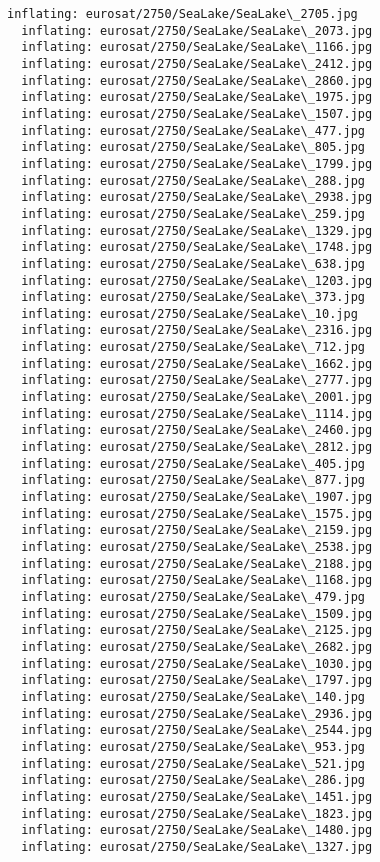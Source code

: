 \documentclass[11pt]{article}
\begin{document}
\begin{Verbatim}[commandchars=\\\{\}]
  inflating: eurosat/2750/SeaLake/SeaLake\_2705.jpg
  inflating: eurosat/2750/SeaLake/SeaLake\_2073.jpg
  inflating: eurosat/2750/SeaLake/SeaLake\_1166.jpg
  inflating: eurosat/2750/SeaLake/SeaLake\_2412.jpg
  inflating: eurosat/2750/SeaLake/SeaLake\_2860.jpg
  inflating: eurosat/2750/SeaLake/SeaLake\_1975.jpg
  inflating: eurosat/2750/SeaLake/SeaLake\_1507.jpg
  inflating: eurosat/2750/SeaLake/SeaLake\_477.jpg
  inflating: eurosat/2750/SeaLake/SeaLake\_805.jpg
  inflating: eurosat/2750/SeaLake/SeaLake\_1799.jpg
  inflating: eurosat/2750/SeaLake/SeaLake\_288.jpg
  inflating: eurosat/2750/SeaLake/SeaLake\_2938.jpg
  inflating: eurosat/2750/SeaLake/SeaLake\_259.jpg
  inflating: eurosat/2750/SeaLake/SeaLake\_1329.jpg
  inflating: eurosat/2750/SeaLake/SeaLake\_1748.jpg
  inflating: eurosat/2750/SeaLake/SeaLake\_638.jpg
  inflating: eurosat/2750/SeaLake/SeaLake\_1203.jpg
  inflating: eurosat/2750/SeaLake/SeaLake\_373.jpg
  inflating: eurosat/2750/SeaLake/SeaLake\_10.jpg
  inflating: eurosat/2750/SeaLake/SeaLake\_2316.jpg
  inflating: eurosat/2750/SeaLake/SeaLake\_712.jpg
  inflating: eurosat/2750/SeaLake/SeaLake\_1662.jpg
  inflating: eurosat/2750/SeaLake/SeaLake\_2777.jpg
  inflating: eurosat/2750/SeaLake/SeaLake\_2001.jpg
  inflating: eurosat/2750/SeaLake/SeaLake\_1114.jpg
  inflating: eurosat/2750/SeaLake/SeaLake\_2460.jpg
  inflating: eurosat/2750/SeaLake/SeaLake\_2812.jpg
  inflating: eurosat/2750/SeaLake/SeaLake\_405.jpg
  inflating: eurosat/2750/SeaLake/SeaLake\_877.jpg
  inflating: eurosat/2750/SeaLake/SeaLake\_1907.jpg
  inflating: eurosat/2750/SeaLake/SeaLake\_1575.jpg
  inflating: eurosat/2750/SeaLake/SeaLake\_2159.jpg
  inflating: eurosat/2750/SeaLake/SeaLake\_2538.jpg
  inflating: eurosat/2750/SeaLake/SeaLake\_2188.jpg
  inflating: eurosat/2750/SeaLake/SeaLake\_1168.jpg
  inflating: eurosat/2750/SeaLake/SeaLake\_479.jpg
  inflating: eurosat/2750/SeaLake/SeaLake\_1509.jpg
  inflating: eurosat/2750/SeaLake/SeaLake\_2125.jpg
  inflating: eurosat/2750/SeaLake/SeaLake\_2682.jpg
  inflating: eurosat/2750/SeaLake/SeaLake\_1030.jpg
  inflating: eurosat/2750/SeaLake/SeaLake\_1797.jpg
  inflating: eurosat/2750/SeaLake/SeaLake\_140.jpg
  inflating: eurosat/2750/SeaLake/SeaLake\_2936.jpg
  inflating: eurosat/2750/SeaLake/SeaLake\_2544.jpg
  inflating: eurosat/2750/SeaLake/SeaLake\_953.jpg
  inflating: eurosat/2750/SeaLake/SeaLake\_521.jpg
  inflating: eurosat/2750/SeaLake/SeaLake\_286.jpg
  inflating: eurosat/2750/SeaLake/SeaLake\_1451.jpg
  inflating: eurosat/2750/SeaLake/SeaLake\_1823.jpg
  inflating: eurosat/2750/SeaLake/SeaLake\_1480.jpg
  inflating: eurosat/2750/SeaLake/SeaLake\_1327.jpg

\end{Verbatim}
\end{document}
